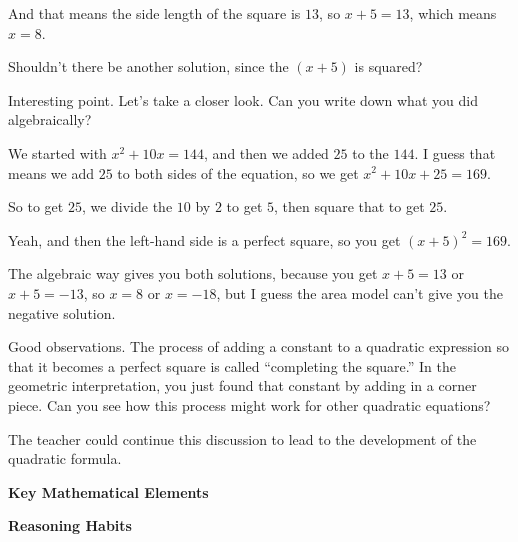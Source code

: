 {\begin{scriptlist}
      \item [Student 1:] And that means the side length of the square is $13$, so $x + 5 = 13$, which means $x = 8$.

      \item [Student 2:] Shouldn't there be another solution, since the $(x + 5)$ is squared?

      \item [Teacher:] Interesting point. Let's take a closer look. Can you write down what you did algebraically?

      \item [Student 2:] We started with $x^2 + 10x = 144$, and then we added $25$ to the $144$. I guess that means we add $25$ to both sides of the equation, so we get $x^2 + 10x + 25 = 169$.\vspace{\baselineskip}

      \item [Student 1:] So to get $25$, we divide the $10$ by $2$ to get $5$, then square that to get $25$.

      \item [Student 2:] Yeah, and then the left-hand side is a perfect square, so you get $(x + 5)^2 = 169$.

      \item [Student 1:] The algebraic way gives you both solutions, because you get $x + 5 = 13$ or $x + 5 = -13$, so $x = 8$ or $x = -18$, but I guess the area model can't give you the negative solution.

      \item [Teacher:] Good observations. The process of adding a constant to a quadratic expression so that it becomes a perfect square is called ``completing the square.'' In the geometric interpretation, you just found that constant by adding in a corner piece. Can you see how this process might work for other quadratic equations?
    \end{scriptlist}\vspace{\baselineskip}

    The teacher could continue this discussion to lead to the development of the quadratic formula.

    \textbf{Key Mathematical Elements}

    \begin{hanglist}
    \end{hanglist}

    \textbf{Reasoning Habits}

    \begin{hanglist}


    \end{hanglist}
  }
